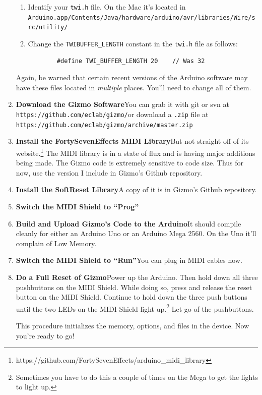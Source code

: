 \documentclass{article}
\begin{document}
\begin{enumerate}
\begin{enumerate}
\item Identify your \texttt{twi.h} file.  On the Mac it's located in\\
\texttt{Arduino.app/Contents/Java/hardware/arduino/avr/libraries/Wire/src/utility/}

\item Change the \texttt{TWIBUFFER\_LENGTH} constant in the \texttt{twi.h} file as follows:

\begin{verbatim}
        #define TWI_BUFFER_LENGTH 20    // Was 32
\end{verbatim}
\end{enumerate}

Again, be warned that certain recent versions of the Arduino software may have these files located in {\it multiple} places.  You'll need to change all of them.


\item {\bf Download the Gizmo Software}\quad You can grab it with git or svn at\\
\texttt{https:/\!/github.com/eclab/gizmo/}\quad or download a \texttt{.zip} file at\\
\texttt{https:/\!/github.com/eclab/gizmo/archive/master.zip}

\item {\bf Install the FortySevenEffects MIDI Library}\quad But not straight off of its website.\footnote{https:/\!/github.com/FortySevenEffects/arduino\_midi\_library}  The MIDI library is in a state of flux and is having major additions being made.  The Gizmo code is extremely sensitive to code size.  Thus for now, use the version I include in Gizmo's Github repository.

\item {\bf Install the SoftReset Library}\quad A copy of it is in Gizmo's Github repository.

\item {\bf Switch the MIDI Shield to ``Prog''}

\item {\bf Build and Upload Gizmo's Code to the Arduino}\quad  It should compile cleanly for either an Arduino Uno or an Arduino Mega 2560.  On the Uno it'll complain of Low Memory.

\item {\bf Switch the MIDI Shield to ``Run''}\quad  You can plug in MIDI cables now.

\item {\bf Do a Full Reset of Gizmo}\quad Power up the Arduino.  Then hold down all three pushbuttons on the MIDI Shield.  While doing so, press and release the reset button on the MIDI Shield.  Continue to hold down the three push buttons until the two LEDs on the MIDI Shield light up.\footnote{Sometimes you have to do this a couple of times on the Mega to get the lights to light up.}  Let go of the pushbuttons.  

This procedure initializes the memory, options, and files in the device.  Now you're ready to go!

\end{enumerate}
\end{document}
